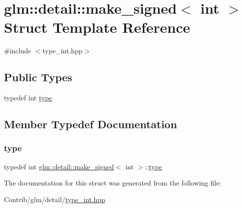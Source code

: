 \hypertarget{structglm_1_1detail_1_1make__signed_3_01int_01_4}{}\section{glm\+:\+:detail\+:\+:make\+\_\+signed$<$ int $>$ Struct Template Reference}
\label{structglm_1_1detail_1_1make__signed_3_01int_01_4}


{\ttfamily \#include $<$type\+\_\+int.\+hpp$>$}

\subsection*{Public Types}
\begin{DoxyCompactItemize}
\item 
typedef int \mbox{\hyperlink{structglm_1_1detail_1_1make__signed_3_01int_01_4_a69085e97a5044d1985cdc2116eb6ea9b}{type}}
\end{DoxyCompactItemize}


\subsection{Member Typedef Documentation}
\mbox{\label{structglm_1_1detail_1_1make__signed_3_01int_01_4_a69085e97a5044d1985cdc2116eb6ea9b}} 
\subsubsection{\texorpdfstring{type}{type}}
{\footnotesize\ttfamily typedef int \mbox{\hyperlink{structglm_1_1detail_1_1make__signed}{glm\+::detail\+::make\+\_\+signed}}$<$ int $>$\+::\mbox{\hyperlink{structglm_1_1detail_1_1make__signed_3_01int_01_4_a69085e97a5044d1985cdc2116eb6ea9b}{type}}}



The documentation for this struct was generated from the following file\+:\begin{DoxyCompactItemize}
\item 
Contrib/glm/detail/\mbox{\hyperlink{type__int_8hpp}{type\+\_\+int.\+hpp}}\end{DoxyCompactItemize}
